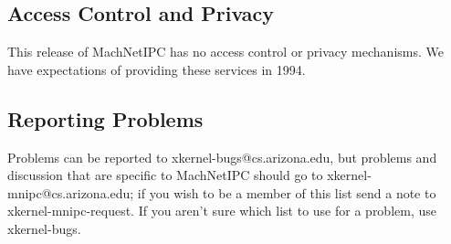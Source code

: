 \subsection{Access Control and Privacy}

This release of MachNetIPC has no access control or privacy
mechanisms.  We have expectations of providing these services in 1994.


\subsection{Reporting Problems}
\label{mnibugs}
Problems can be reported to xkernel-bugs@cs.arizona.edu, but problems
and discussion that are specific to MachNetIPC should go to
xkernel-mnipc@cs.arizona.edu; if you wish to be a member of this list
send a note to xkernel-mnipc-request.  If you aren't sure which list
to use for a problem, use xkernel-bugs.
